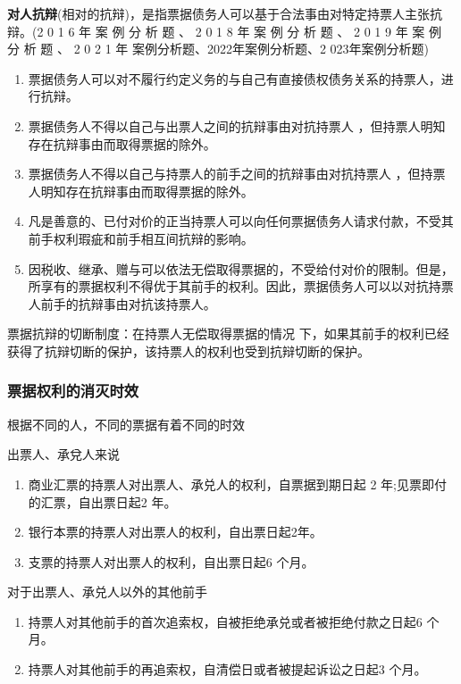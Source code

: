 \documentclass[UTF8,12pt]{ctexart}
\numberwithin{equation}{section} %
\numberwithin{figure}{section}
\numberwithin{table}{section}
\begin{document}
	\textbf{对人抗辩}(相对的抗辩)，是指票据债务人可以基于合法事由对特定持票人主张抗辩。(2 0 1 6 年 案 例 分 析 题 、 2 0 1 8 年 案 例 分 析 题 、 2 0 1 9 年 案 例 分 析 题 、 2 0 2 1 年 案例分析题、2022年案例分析题、2 023年案例分析题)
	\begin{enumerate}
		\item 票据债务人可以对不履行约定义务的与自己有直接债权债务关系的持票人，进行抗辩。
		
		\item 票据债务人不得以自己与出票人之间的抗辩事由对抗持票人 ，但持票人明知存在抗辩事由而取得票据的除外。
		
		\item 票据债务人不得以自己与持票人的前手之间的抗辩事由对抗持票人 ，但持票人明知存在抗辩事由而取得票据的除外。
		
		\item 凡是善意的、已付对价的正当持票人可以向任何票据债务人请求付款，不受其前手权利瑕疵和前手相互间抗辩的影响。
		
		\item 因税收、继承、赠与可以依法无偿取得票据的，不受给付对价的限制。但是，所享有的票据权利不得优于其前手的权利。因此，票据债务人可以以对抗持票人前手的抗辩事由对抗该持票人。
	\end{enumerate}
	
	票据抗辩的切断制度：在持票人无偿取得票据的情况 下，如果其前手的权利已经获得了抗辩切断的保护，该持票人的权利也受到抗辩切断的保护。
	
	\subsubsection{票据权利的消灭时效} 
	根据不同的人，不同的票据有着不同的时效
	
	出票人、承兌人来说
	\begin{enumerate}
		\item 商业汇票的持票人对出票人、承兑人的权利，自票据到期日起 2 年;见票即付的汇票，自出票日起2 年。
		
		\item 银行本票的持票人对出票人的权利，自出票日起2年。
		
		\item 支票的持票人对出票人的权利，自出票日起6 个月。
	\end{enumerate}
	
	对于出票人、承兑人以外的其他前手
	\begin{enumerate}
		\item 持票人对其他前手的首次追索权，自被拒绝承兑或者被拒绝付款之日起6 个月。
		
		\item 持票人对其他前手的再追索权，自清偿日或者被提起诉讼之日起3 个月。
	\end{enumerate}
\end{document}
